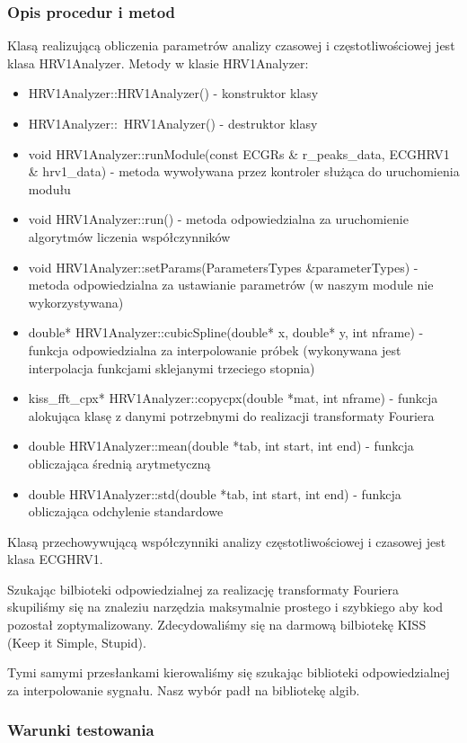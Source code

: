 \documentclass[a4paper, 11pt]{article}
\begin{document}
\subsubsection{Opis procedur i metod}
\label{sec:baseline:procs}
Klasą realizującą obliczenia parametrów analizy czasowej i częstotliwościowej jest klasa HRV1Analyzer.
Metody w klasie HRV1Analyzer:
\begin{itemize}
\item HRV1Analyzer::HRV1Analyzer() - konstruktor klasy
\item HRV1Analyzer::~HRV1Analyzer() - destruktor klasy
\item void HRV1Analyzer::runModule(const ECGRs \& r\_peaks\_data, ECGHRV1 \& hrv1\_data) - metoda wywoływana przez kontroler służąca do uruchomienia modułu
\item void HRV1Analyzer::run() - metoda odpowiedzialna za uruchomienie algorytmów liczenia współczynników
\item void HRV1Analyzer::setParams(ParametersTypes \&parameterTypes) - metoda odpowiedzialna za ustawianie parametrów (w naszym module nie wykorzystywana)
\item double* HRV1Analyzer::cubicSpline(double* x, double* y, int nframe) - funkcja odpowiedzialna za interpolowanie próbek (wykonywana jest interpolacja funkcjami sklejanymi trzeciego stopnia)
\item kiss\_fft\_cpx* HRV1Analyzer::copycpx(double *mat, int nframe) - funkcja alokująca klasę z danymi potrzebnymi do realizacji transformaty Fouriera
\item double HRV1Analyzer::mean(double *tab, int start, int end) - funkcja obliczająca średnią arytmetyczną
\item double HRV1Analyzer::std(double *tab, int start, int end) - funkcja obliczająca odchylenie standardowe
\end{itemize}

Klasą przechowywującą współczynniki analizy częstotliwościowej i czasowej jest klasa ECGHRV1.

Szukając bilbioteki odpowiedzialnej za realizację transformaty Fouriera skupiliśmy się na znaleziu narzędzia maksymalnie prostego i szybkiego aby kod pozostał zoptymalizowany. Zdecydowaliśmy się na darmową bilbiotekę KISS (Keep it Simple, Stupid).

Tymi samymi przesłankami kierowaliśmy się szukając biblioteki odpowiedzialnej za interpolowanie sygnału. Nasz wybór padł na bibliotekę algib.

\subsubsection{Warunki testowania}
\label{sec:hrv1:tests}
\end{document}
